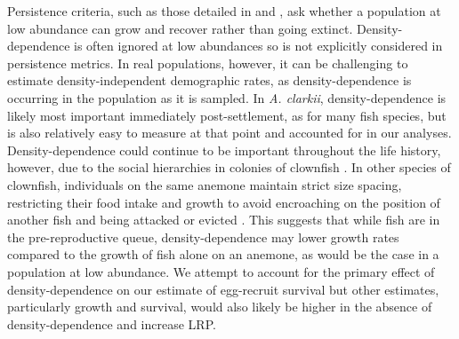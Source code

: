 \documentclass[12pt, oneside]{article}   	%
\begin{document}
Persistence criteria, such as those detailed in \cite{hastings_persistence_2006} and \cite{burgess2014beyond}, ask whether a population at low abundance can grow and recover rather than going extinct. Density-dependence is often ignored at low abundances \citep{botsford2019population} so is not explicitly considered in persistence metrics. In real populations, however, it can be challenging to estimate density-independent demographic rates, as density-dependence is occurring in the population as it is sampled. In \textit{A. clarkii}, density-dependence is likely most important immediately post-settlement, as for many fish species, but is also relatively easy to measure at that point and accounted for in our analyses. Density-dependence could continue to be important throughout the life history, however, due to the social hierarchies in colonies of clownfish \citep[e.g.][]{buston2011determinants}. In other species of clownfish, individuals on the same anemone maintain strict size spacing, restricting their food intake and growth to avoid encroaching on the position of another fish and being attacked or evicted \citep[seen in \textit{A. percula},][]{buston2003forcible, buston2003social}. This suggests that while fish are in the pre-reproductive queue, density-dependence may lower growth rates compared to the growth of fish alone on an anemone, as would be the case in a population at low abundance. We attempt to account for the primary effect of density-dependence on our estimate of egg-recruit survival but other estimates, particularly growth and survival, would also likely be higher in the absence of density-dependence and increase LRP.


\end{document}
